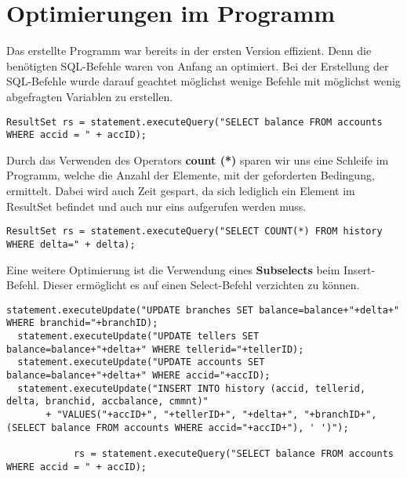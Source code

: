\section{Optimierungen im Programm}
Das erstellte Programm war bereits in der ersten Version effizient. Denn die
benötigten SQL-Befehle waren von Anfang an optimiert. Bei der Erstellung der
SQL-Befehle wurde darauf geachtet möglichst wenige Befehle mit möglichst wenig
abgefragten Variablen zu erstellen.
\begin{lstlisting}[caption={Statement der Funktion kontostandTX in
TXHandler.java}] 
   ResultSet rs = statement.executeQuery("SELECT balance FROM accounts WHERE accid = " + accID);
\end{lstlisting}

Durch das Verwenden des Operators \textbf{count (*)} sparen wir uns eine
Schleife im Programm, welche die Anzahl der Elemente, mit der geforderten Bedingung,
ermittelt. Dabei wird auch Zeit gespart, da sich lediglich ein Element im
ResultSet befindet und auch nur eins aufgerufen werden muss. 
\begin{lstlisting}[caption={Statement der Funktion analyseTX in
TXHandler.java}] 
  ResultSet rs = statement.executeQuery("SELECT COUNT(*) FROM history WHERE delta=" + delta);
\end{lstlisting}
 
Eine weitere Optimierung ist die Verwendung eines \textbf{Subselects} beim
Insert-Befehl.
Dieser ermöglicht es auf einen Select-Befehl verzichten zu können.
\begin{lstlisting}[caption={Statement der Funktion einzahlungTX in
TXHandler.java}] 
  statement.executeUpdate("UPDATE branches SET balance=balance+"+delta+" WHERE branchid="+branchID);
  statement.executeUpdate("UPDATE tellers SET balance=balance+"+delta+" WHERE tellerid="+tellerID);
  statement.executeUpdate("UPDATE accounts SET balance=balance+"+delta+" WHERE accid="+accID);
  statement.executeUpdate("INSERT INTO history (accid, tellerid, delta, branchid, accbalance, cmmnt)"
       + "VALUES("+accID+", "+tellerID+", "+delta+", "+branchID+", (SELECT balance FROM accounts WHERE accid="+accID+"), ' ')");
            
            rs = statement.executeQuery("SELECT balance FROM accounts WHERE accid = " + accID);
\end{lstlisting}

